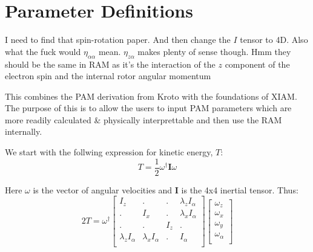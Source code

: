 \documentclass{article}
\begin{document}
\section{Parameter Definitions}
I need to find that spin-rotation paper. And then change the $I$ tensor to 4D. Also what the fuck would $\eta_{\alpha\alpha}$ mean. $\eta_{z\alpha}$ makes plenty of sense though. Hmm they should be the same in RAM as it's the interaction of the $z$ component of the electron spin and the internal rotor angular momentum

This combines the PAM derivation from Kroto with the foundations of XIAM. The purpose of this is to allow the users to input PAM parameters which are more readily calculated \& physically interprettable and then use the RAM internally.

We start with the follwing expression for kinetic energy, $T$:
\begin{equation}
	T = \frac{1}{2}\omega^{\dagger}\mathbf{I}\omega
\end{equation}

Here $\omega$ is the vector of angular velocities and $\mathbf{I}$ is the 4x4 inertial tensor. Thus:
\begin{equation}
	2T = \omega^{\dagger}
	\begin{bmatrix}
		I_{z} & . & . & \lambda_{z}I_{\alpha} \\
		. & I_{x} & . & \lambda_{x}I_{\alpha} \\
		. & . & I_{z} & . \\
		\lambda_{z}I_{\alpha} & \lambda_{x}I_{\alpha} & . & I_{\alpha} \\
	\end{bmatrix}
	\begin{bmatrix}
		\omega_{z} \\
		\omega_{x} \\
		\omega_{y} \\
		\omega_{\alpha} \\
	\end{bmatrix}
\end{equation}
\end{document}
